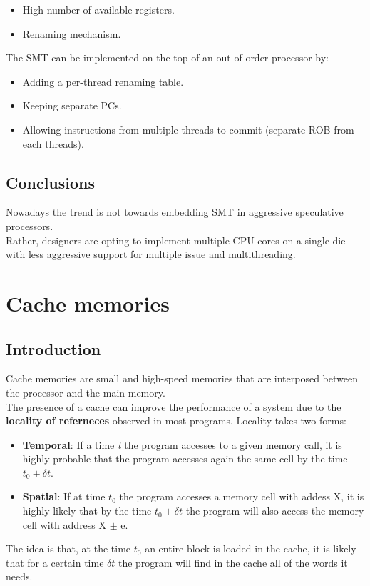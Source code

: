 \documentclass[12pt]{article}
\begin{document}
\begin{itemize}
  \item High number of available registers.
  \item Renaming mechanism.
\end{itemize}
The SMT can be implemented on the top of an out-of-order processor by:
\begin{itemize}
  \item Adding a per-thread renaming table.
  \item Keeping separate PCs.
  \item Allowing instructions from multiple threads to commit (separate ROB from each threads).
\end{itemize}

\subsection{Conclusions}
Nowadays the trend is not towards embedding SMT in aggressive speculative processors.\\
Rather, designers are opting to implement multiple CPU cores on a single die with less aggressive support for multiple issue and multithreading.

\section{Cache memories}
\subsection{Introduction}
Cache memories are small and high-speed memories that are interposed between the processor and the main memory.\\
The presence of a cache can improve the performance of a system due to the \textbf{locality of referneces} observed in most programs. Locality takes two forms:
\begin{itemize}
  \item \textbf{Temporal}: If a time \textit{t} the program accesses to a given memory call, it is highly probable that the program accesses again the same cell by the time $t_0 + \delta t$.
  \item \textbf{Spatial}: If at time $t_0$ the program accesses a memory cell with addess X, it is highly likely that by the time $t_0 + \delta t$ the program will also access the memory cell with address X $\pm$ e.
\end{itemize}
The idea is that, at the time $t_0$ an entire block is loaded in the cache, it is likely that for a certain time $\delta t$ the program will find in the cache all of the words it needs.
\end{document}
